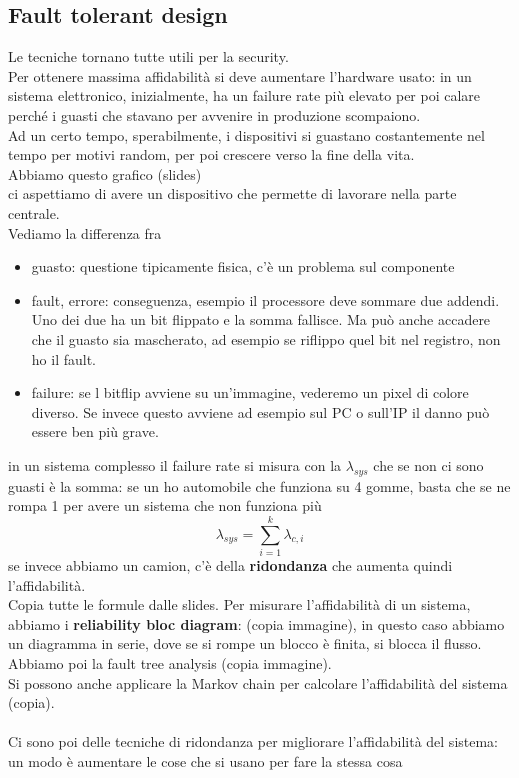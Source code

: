 \documentclass[oneside, 12pt]{extbook}
\begin{document}
\subsection{Fault tolerant design}
Le tecniche tornano tutte utili per la security.\\Per ottenere massima affidabilità si deve aumentare l'hardware usato: in un sistema elettronico, inizialmente, ha un failure rate più elevato per poi calare perché i guasti che stavano per avvenire in produzione scompaiono.\\Ad un certo tempo, sperabilmente, i dispositivi si guastano costantemente nel tempo per motivi random, per poi crescere verso la fine della vita.\\Abbiamo questo grafico (slides)\\ci aspettiamo di avere un dispositivo che permette di lavorare nella parte centrale.\\Vediamo la differenza fra
\begin{itemize}
	\item guasto: questione tipicamente fisica, c'è un problema sul componente
	\item fault, errore: conseguenza, esempio il processore deve sommare due addendi. Uno dei due ha un bit flippato e la somma fallisce. Ma può anche accadere che il guasto sia mascherato, ad esempio se riflippo quel bit nel registro, non ho il fault.
	\item failure: se l bitflip avviene su un'immagine, vederemo un pixel di colore diverso. Se invece questo avviene ad esempio sul PC o sull'IP il danno può essere ben più grave.
\end{itemize}
in un sistema complesso il failure rate si misura con la $\lambda_{sys}$ che se non ci sono guasti è la somma: se un ho automobile che funziona su 4 gomme, basta che se ne rompa 1 per avere un sistema che non funziona più
\begin{equation}
	\lambda_{sys} = \sum\limits_{i=1}^{k} \lambda_{c,i}
\end{equation}
se invece abbiamo un camion, c'è della \textbf{ridondanza} che aumenta quindi l'affidabilità.\\Copia tutte le formule dalle slides. Per misurare l'affidabilità di un sistema, abbiamo i \textbf{reliability bloc diagram}: (copia immagine), in questo caso abbiamo un diagramma in serie, dove se si rompe un blocco è finita, si blocca il flusso.\\Abbiamo poi la fault tree analysis (copia immagine).\\Si possono anche applicare la Markov chain per calcolare l'affidabilità del sistema (copia).\\\\Ci sono poi delle tecniche di ridondanza per migliorare l'affidabilità del sistema: un modo è aumentare le cose che si usano per fare la stessa cosa
\end{document}

